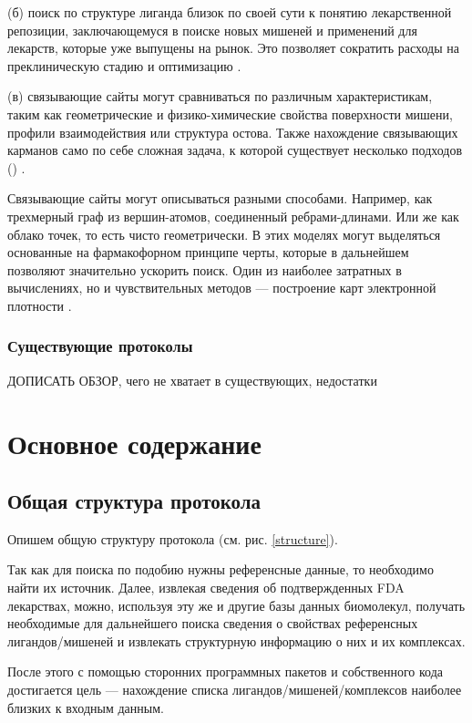 \documentclass[a4paper,14pt]{article}         %
\newcommand{\sic}[1]{\LARGE\color{orange}{#1}\color{black}\Large}
\begin{document}
(б) поиск по структуре лиганда близок по своей сути к понятию лекарственной репозиции, заключающемуся в поиске новых мишеней и применений для лекарств, которые уже выпущены на рынок. Это позволяет сократить расходы на преклиническую стадию и оптимизацию \cite{Hall2015, March-Vila2017}.

(в) связывающие сайты могут сравниваться по различным характеристикам, таким как геометрические и физико-химические свойства поверхности мишени, профили взаимодействия или структура остова. Также нахождение связывающих карманов само по себе сложная задача, к которой существует несколько подходов (\sic{добавить, как ее решать}) \cite{Ehrt2016}. 

Связывающие сайты могут описываться разными способами. Например, как трехмерный граф из вершин-атомов, соединенный ребрами-длинами. Или же как облако точек, то есть чисто геометрически. В этих моделях могут выделяться основанные на фармакофорном принципе черты, которые в дальнейшем позволяют значительно ускорить поиск. Один из наиболее затратных в вычислениях, но и чувствительных методов --- построение карт электронной плотности \cite{Ehrt2016}.
\subsubsection{Существующие протоколы}
\color{orange} ДОПИСАТЬ ОБЗОР, чего не хватает в существующих, недостатки\cite{Chartier2017}
\color{black}


\newpage
\section{Основное содержание}
\subsection{Общая структура протокола}
Опишем общую структуру протокола (см. рис. \ref{structure}).

Так как для поиска по подобию нужны референсные данные, то необходимо найти их источник. Далее, извлекая сведения об подтвержденных FDA лекарствах, можно, используя эту же и другие базы данных биомолекул, получать необходимые для дальнейшего поиска сведения о свойствах референсных лигандов/мишеней и извлекать структурную информацию о них и их комплексах.

После этого с помощью сторонних программных пакетов и собственного кода достигается цель --- нахождение списка лигандов/мишеней/комплексов наиболее близких к входным данным.
\end{document}
